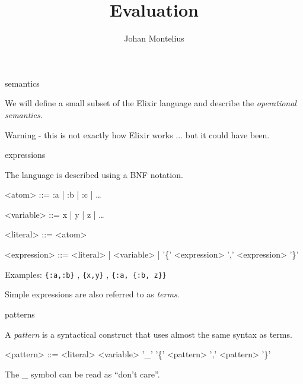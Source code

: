 

\title[ID1019 Evaluation]{Evaluation}


\author{Johan Montelius}
\date{\semester}



\begin{frame}
\titlepage
\end{frame}

\begin{frame}{semantics}

We will define a small subset of the Elixir language and describe the
{\em operational semantics}.


\pause \vspace{40pt}Warning - this is not exactly how Elixir works ... but it could have been.

\end{frame}


\begin{frame}{expressions}

  The language is described using a BNF notation.
  \pause
  \vspace{10pt}
  
\begin{grammar}
<atom> ::= :a | :b | :c | \ldots

<variable> ::= x | y | z | \ldots

<literal> ::= <atom>

<expression> ::= <literal> | <variable> |  '\{' <expression> ',' <expression> '\}'
\end{grammar}

\pause \vspace{20pt} Examples: {\tt \{:a,:b\}} , {\tt \{x,y\}} , {\tt \{:a, \{:b, z\}\}}

\pause \vspace{20pt} Simple expressions are also referred to as {\em terms}.

\end{frame}

\begin{frame}{patterns}

  A {\em pattern} is a syntactical construct that uses almost the same
  syntax as terms.

  \pause
  \vspace{20pt}

\begin{grammar}
<pattern> ::= <literal> 
      \alt <variable> 
      \alt '\_' 
      \alt '\{' <pattern> ',' <pattern> '\}'
\end{grammar}

 \pause \vspace{20pt}
  The \_ symbol can be read as ``don't care''.

\end{frame}


